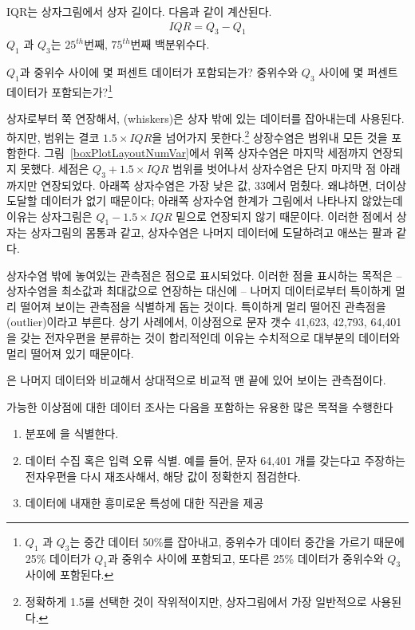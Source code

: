 \begin{termBox}{
IQR는 상자그림에서 상자 길이다. 다음과 같이 계산된다.
\begin{eqnarray*}
IQR = Q_3 - Q_1
\end{eqnarray*}
$Q_1$ 과 $Q_3$는 $25^{th}$번째, $75^{th}$번째 백분위수다.}
\end{termBox}

\begin{exercise}
$Q_1$과 중위수 사이에 몇 퍼센트 데이터가 포함되는가?
중위수와 $Q_3$ 사이에 몇 퍼센트 데이터가 포함되는가?\footnote{
$Q_1$ 과 $Q_3$는 중간 데이터 50\%를 잡아내고, 중위수가 데이터 중간을 가르기 때문에 25\% 데이터가 $Q_1$과 중위수 사이에 포함되고, 또다른 25\% 데이터가 중위수와 $Q_3$ 사이에 포함된다.}
\end{exercise}

상자로부터 쭉 연장해서, (whiskers)은 상자 밖에 있는 데이터를 잡아내는데 사용된다. 하지만, 범위는 결코 $1.5\times IQR$을 넘어가지 못한다.\footnote{정확하게 1.5를 선택한 것이 작위적이지만, 상자그림에서 가장 일반적으로 사용된다.} 상장수염은 범위내 모든 것을 포함한다.  그림~\ref{boxPlotLayoutNumVar}에서 위쪽 상자수염은 마지막 세점까지 연장되지 못했다. 세점은 $Q_3 + 1.5\times IQR$ 범위를 벗어나서 상자수염은 단지 마지막 점 아래까지만 연장되었다. 아래쪽 상자수염은 가장 낮은 값, 33에서 멈췄다. 왜냐하면, 더이상 도달할 데이터가 없기 때문이다; 아래쪽 상자수염 한계가 그림에서 나타나지 않았는데 이유는 상자그림은 $Q_1 - 1.5\times IQR$ 밑으로 연장되지 않기 때문이다. 이러한 점에서 상자는 상자그림의 몸통과 같고, 상자수염은 나머지 데이터에 도달하려고 애쓰는 팔과 같다.

상자수염 밖에 놓여있는 관측점은 점으로 표시되었다. 이러한 점을 표시하는 목적은 -- 상자수염을 최소값과 최대값으로 연장하는 대신에 -- 나머지 데이터로부터 특이하게 멀리 떨어져 보이는 관측점을 식별하게 돕는 것이다.
특이하게 멀리 떨어진 관측점을 (outlier)이라고 부른다.
상기 사례에서, 이상점으로 문자 갯수 41,623, 42,793, 64,401 을 갖는 전자우편을 분류하는 것이 합리적인데 이유는 수치적으로 대부분의 데이터와 멀리 떨어져 있기 때문이다.

\begin{termBox}{
은 나머지 데이터와 비교해서 상대적으로 비교적 맨 끝에 있어 보이는 관측점이다.}
\end{termBox}


\begin{tipBox}{
가능한 이상점에 대한 데이터 조사는 다음을 포함하는 유용한 많은 목적을 수행한다\vspace{-2mm}
\begin{enumerate}
\setlength{\itemsep}{0mm}
\item 분포에 을 식별한다.
\item 데이터 수집 혹은 입력 오류 식별.  예를 들어, 문자 64,401 개를 갖는다고 주장하는 전자우편을 다시 재조사해서, 해당 값이 정확한지 점검한다.
\item 데이터에 내재한 흥미로운 특성에 대한 직관을 제공\vspace{0.5mm}
\end{enumerate}}
\end{tipBox}

